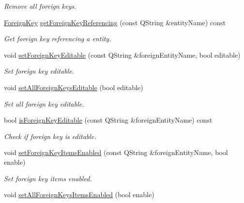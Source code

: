 \begin{DoxyCompactItemize}
\begin{DoxyCompactList}\small\item\em Remove all foreign keys. \end{DoxyCompactList}\item 
\hyperlink{class_mdt_1_1_item_model_1_1_foreign_key}{Foreign\+Key} \hyperlink{class_mdt_1_1_item_model_1_1_foreign_key_proxy_model_ad1d0037eb5eedd6966ef377281c976a6}{get\+Foreign\+Key\+Referencing} (const Q\+String \&entity\+Name) const 
\begin{DoxyCompactList}\small\item\em Get foreign key referencing a entity. \end{DoxyCompactList}\item 
void \hyperlink{class_mdt_1_1_item_model_1_1_foreign_key_proxy_model_a7ec0f90642a6a3d20d0daf0d05cc8bed}{set\+Foreign\+Key\+Editable} (const Q\+String \&foreign\+Entity\+Name, bool editable)
\begin{DoxyCompactList}\small\item\em Set foreign key editable. \end{DoxyCompactList}\item 
void \hyperlink{class_mdt_1_1_item_model_1_1_foreign_key_proxy_model_ac8c7576981f48f3d31d747f86ca638b5}{set\+All\+Foreign\+Keys\+Editable} (bool editable)
\begin{DoxyCompactList}\small\item\em Set all foreign key editable. \end{DoxyCompactList}\item 
bool \hyperlink{class_mdt_1_1_item_model_1_1_foreign_key_proxy_model_a149eb5bf3db72fb75fedefa269cbe238}{is\+Foreign\+Key\+Editable} (const Q\+String \&foreign\+Entity\+Name) const 
\begin{DoxyCompactList}\small\item\em Check if foreign key is editable. \end{DoxyCompactList}\item 
void \hyperlink{class_mdt_1_1_item_model_1_1_foreign_key_proxy_model_a3558f883f7ae773999bb8602c9dae791}{set\+Foreign\+Key\+Items\+Enabled} (const Q\+String \&foreign\+Entity\+Name, bool enable)
\begin{DoxyCompactList}\small\item\em Set foreign key items enabled. \end{DoxyCompactList}\item 
void \hyperlink{class_mdt_1_1_item_model_1_1_foreign_key_proxy_model_a67bee0dcb4c4f1fb1e92047fd6d1ff92}{set\+All\+Foreign\+Keys\+Items\+Enabled} (bool enable)

\end{DoxyCompactItemize}
